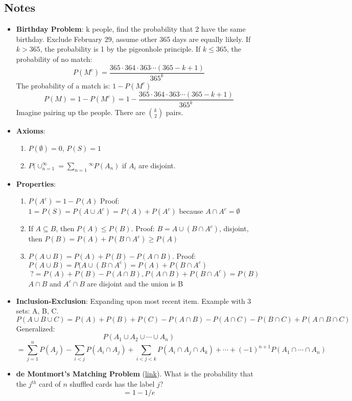 \documentclass[11pt, oneside]{article}   	%
\begin{document}
	\subsection{Notes}
	\begin{itemize}
		\item \textbf{Birthday Problem}: k people, find the probability that 2 have the same birthday. Exclude February 29, assume other 365 days are equally likely.
			If $k > 365$, the probability is 1 by the pigeonhole principle.
			If $k \leq 365$, the probability of no match:
				\[
					P(M^c)= \frac{365 \cdot 364 \cdot 363 \cdots (365 - k + 1)}{365^k}
				\]
			The probability of a match is: $1 - P(M^c)$
				\[
					P(M) = 1 - P(M^c) = 1 - \frac{365 \cdot 364 \cdot 363 \cdots (365 - k + 1)}{365^k}
				\]
			Imagine pairing up the people. There are $\binom{k}{2}$ pairs.
		\item \textbf{Axioms}:
			\begin{enumerate}
				\item $P(\emptyset) = 0$, $P(S) = 1$
				\item $P( \cup_{n=1}^{\infty} = \sum_{n=1}{^\infty}P(A_n)$ if $A_i$ are disjoint.
			\end{enumerate}
		\item \textbf{Properties}:
			\begin{enumerate}
				\item $P(A^c) = 1 - P(A)$ Proof: $1 = P(S) = P(A \cup A^c) = P(A) + P(A^c)$ because $A \cap A^c = \emptyset$
				\item If $ A \subseteq B$, then $P(A) \leq P(B)$. Proof: $B = A \cup (B \cap A^c)$, disjoint, then $P(B) = P(A) + P(B \cap A^c) \geq P(A)$
				\item $P(A \cup B) = P(A) + P(B) - P(A \cap B)$. Proof: $P(A \cup B) = P(A \cup ( B \cap A^c ) = P(A) + P(B \cap A^c)$
					\[
					 	?= P(A) + P(B) - P(A \cap B), P(A \cap B) + P(B \cap A^c) = P(B)
					\]
					$A \cap B$ and $A^c \cap B$ are disjoint and the union is B
			\end{enumerate}
		\item \textbf{Inclusion-Exclusion}: Expanding upon most recent item. Example with 3 sets: A, B, C.
			\[
				P(A \cup B \cup C) = P(A) + P(B) + P(C) - P(A \cap B) - P(A \cap C) - P(B \cap C) + P(A \cap B \cap C)
			\]
			Generalized:
			\[
				P(A_1 \cup A_2 \cup \cdots \cup A_n)
			\]
			\[
				= \sum_{j=1}^{n}P(A_j) - \sum_{i < j}P(A_i \cap A_j) + \sum_{i < j < k}P(A_i \cap A_j \cap A_k) + \cdots + (-1)^{n+1}P(A_1 \cap \cdots \cap A_n)
			\]
		\item \textbf{de Montmort's Matching Problem} (\href{http://www.math.uah.edu/stat/urn/Matching.html}{link}).
			What is the probability that the $j^{th}$ card of $n$ shuffled cards has the label $j$?
			\[
				= 1 - 1/e
			\]
	\end{itemize}
\end{document}
